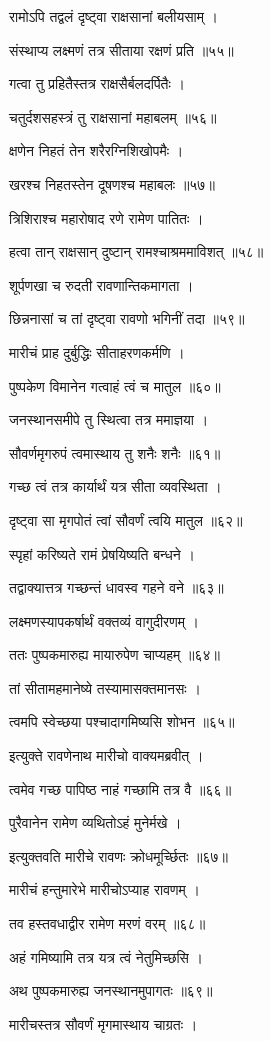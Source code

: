 रामोऽपि तद्वलं दृष्ट्वा राक्षसानां बलीयसाम् ।

संस्थाप्य लक्ष्मणं तत्र सीताया रक्षणं प्रति ॥५५॥

गत्वा तु प्रहितैस्तत्र राक्षसैर्बलदर्पितैः ।

चतुर्दशसहस्त्रं तु राक्षसानां महाबलम् ॥५६॥

क्षणेन निहतं तेन शरैरग्निशिखोपमैः ।

खरश्च निहतस्तेन दूषणश्च महाबलः ॥५७॥

त्रिशिराश्च महारोषाद रणे रामेण पातितः ।

हत्वा तान् राक्षसान् दुष्टान् रामश्चाश्रममाविशत् ॥५८॥

शूर्पणखा च रुदती रावणान्तिकमागता ।

छिन्ननासां च तां दृष्ट्वा रावणो भगिनीं तदा ॥५९॥

मारीचं प्राह दुर्बुद्धिः सीताहरणकर्मणि ।

पुष्पकेण विमानेन गत्वाहं त्वं च मातुल ॥६०॥

जनस्थानसमीपे तु स्थित्वा तत्र ममाज्ञया ।

सौवर्णमृगरुपं त्वमास्थाय तु शनैः शनैः ॥६१॥

गच्छ त्वं तत्र कार्यार्थं यत्र सीता व्यवस्थिता ।

दृष्ट्वा सा मृगपोतं त्वां सौवर्णं त्वयि मातुल ॥६२॥

स्पृहां करिष्यते रामं प्रेषयिष्यति बन्धने ।

तद्वाक्यात्तत्र गच्छन्तं धावस्व गहने वने ॥६३॥

लक्ष्मणस्यापकर्षार्थं वक्तव्यं वागुदीरणम् ।

ततः पुष्पकमारुह्य मायारुपेण चाप्यहम् ॥६४॥

तां सीतामहमानेष्ये तस्यामासक्तमानसः ।

त्वमपि स्वेच्छया पश्चादागमिष्यसि शोभन ॥६५॥

इत्युक्ते रावणेनाथ मारीचो वाक्यमब्रवीत् ।

त्वमेव गच्छ पापिष्ठ नाहं गच्छामि तत्र वै ॥६६॥

पुरैवानेन रामेण व्यथितोऽहं मुनेर्मखे ।

इत्युक्तवति मारीचे रावणः क्रोधमूर्च्छितः ॥६७॥

मारीचं हन्तुमारेभे मारीचोऽप्याह रावणम् ।

तव हस्तवधाद्वीर रामेण मरणं वरम् ॥६८॥

अहं गमिष्यामि तत्र यत्र त्वं नेतुमिच्छसि ।

अथ पुष्पकमारुह्य जनस्थानमुपागतः ॥६९॥

मारीचस्तत्र सौवर्णं मृगमास्थाय चाग्रतः ।

